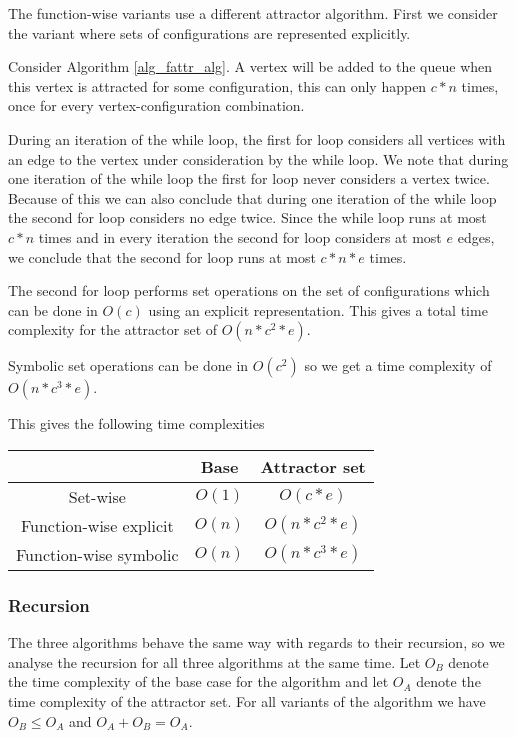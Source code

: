 The function-wise variants use a different attractor algorithm. First we consider the variant where sets of configurations are represented explicitly.

Consider Algorithm \ref{alg_fattr_alg}. A vertex will be added to the queue when this vertex is attracted for some configuration, this can only happen $c*n$ times, once for every vertex-configuration combination. 


During an iteration of the while loop, the first for loop considers all vertices with an edge to the vertex under consideration by the while loop. We note that during one iteration of the while loop the first for loop never considers a vertex twice. Because of this we can also conclude that during one iteration of the while loop the second for loop considers no edge twice. Since the while loop runs at most $c*n$ times and in every iteration the second for loop considers at most $e$ edges, we conclude that the second for loop runs at most $c*n*e$ times. 

The second for loop performs set operations on the set of configurations which can be done in $O(c)$ using an explicit representation. This gives a total time complexity for the attractor set of $O(n*c^2*e)$.

Symbolic set operations can be done in $O(c^2)$ so we get a time complexity of $O(n*c^3*e)$.

This gives the following time complexities\\
\begin{center}
	\begin{tabular}{|c|c|c|}
		\hline 
		& Base & Attractor set \\ 
		\hline 
		Set-wise & $O(1)$ & $O(c*e)$  \\ 
		\hline 
		Function-wise explicit & $O(n)$ &  $O(n*c^2*e)$ \\ 
		\hline 
		Function-wise symbolic & $O(n)$ &  $O(n* c^3*e)$ \\ 
		\hline 
	\end{tabular} 
\end{center}

\subsubsection{Recursion} The three algorithms behave the same way with regards to their recursion, so we analyse the recursion for all three algorithms at the same time. Let $O_B$ denote the time complexity of the base case for the algorithm and let $O_A$ denote the time complexity of the attractor set. For all variants of the algorithm we have $O_B \leq O_A$ and $O_A + O_B = O_A$.

